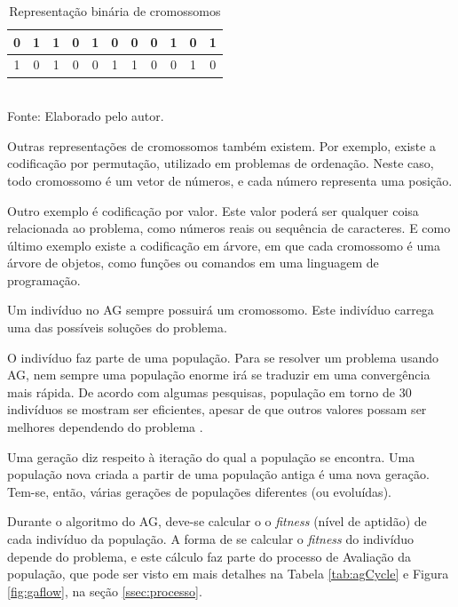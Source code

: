 \documentclass[
	12pt,					%
	openright,				%
	oneside,				%
	a4paper,				%
	bibjustif,				%
	chapter=TITLE,			%
	english,				%
	brazil,					%
	]{abntex2}
\newcommand{\source}[1]{\small Fonte: {#1}}
\begin{document}
	\begin{table}[ht]
		\caption{Representação binária de cromossomos}
		\centering
		\begin{tabular}{c c c c c c c c c c c}
			\hline 
			0 & 1 & 1 & 0 & 1 & 0 & 0 & 0 & 1 & 0 & 1\\ 
			\hline 
			1 & 0 & 1 & 0 & 0 & 1 & 1 & 0 & 0 & 1 & 0\\ 
			\hline 
		\end{tabular} \\
		\vspace{3mm}
		\source{Elaborado pelo autor.}
		\label{tab:cromosome}
	\end{table}
	
	Outras representações de cromossomos também existem.
	Por exemplo, existe a codificação por permutação,
	utilizado em problemas de ordenação.
	Neste caso, todo cromossomo é um vetor de números,
	e cada número representa uma posição.
	
	Outro exemplo é codificação por valor.
	Este valor poderá ser qualquer coisa relacionada ao problema,
	como números reais ou sequência de caracteres.
	E como último exemplo existe a codificação em árvore,
	em que cada cromossomo é uma árvore de objetos,
	como funções ou comandos em uma linguagem de programação.
	
	Um indivíduo no AG sempre possuirá um cromossomo.
	Este indivíduo carrega uma das possíveis soluções do problema.
	
	O indivíduo faz parte de uma população.
	Para se resolver um problema usando AG,
	nem sempre uma população enorme irá se traduzir em uma convergência mais rápida.
	De acordo com algumas pesquisas,
	população em torno de 30 indivíduos se mostram ser eficientes,
	apesar de que outros valores possam ser melhores dependendo do problema
	\cite{obitko}.
	
	Uma geração diz respeito à iteração do qual a população se encontra.
	Uma população nova criada a partir de uma população antiga é uma nova geração.
	Tem-se, então, várias gerações de populações diferentes (ou evoluídas).
	
	Durante o algoritmo do AG, deve-se calcular o o \textit{fitness} (nível de aptidão) de cada indivíduo da população.
	A forma de se calcular o \textit{fitness} do indivíduo depende do problema,
	e este cálculo faz parte do processo de Avaliação da população,
	que pode ser visto em mais detalhes na Tabela \ref{tab:agCycle} e Figura \ref{fig:gaflow},
	na seção \ref{ssec:processo}.
	
\end{document}
